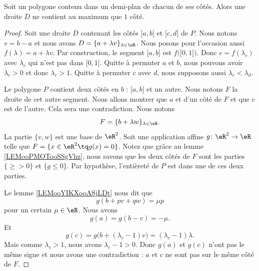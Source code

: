 \begin{lemma}	\label{LEMooMSJRooWYXQDY}
	Soit un polygone contenu dans un demi-plan de chacun de ses côtés. Alors une droite \( D\) ne contient au maximum que \( 1\) côté.
\end{lemma}

\begin{proof}
	Soit une droite \( D\) contenant les côtés \( \mathopen[ a,b\mathclose]\) et \( \mathopen[ c,d\mathclose]\) de \( P\). Nous notons \( v=b-a\) et nous avons \( D=\{ a+\lambda v \}_{\lambda\in \eR}\). Nous posons pour l'occasion aussi \( f(\lambda)=a+\lambda v\). Par construction, le segment \( \mathopen[ a,b\mathclose]\) est \( f\big( \mathopen[ 0,1\mathclose] \big)\). Donc \( c=f(\lambda_c)\) avec \( \lambda_c\) qui n'est pas dans \( \mathopen[ 0,1\mathclose]\). Quitte à permuter \( a\) et \( b\), nous pouvons avoir \( \lambda_c>0\) et donc \( \lambda_c>1\). Quitte à permuter \( c\) avec \( d\), nous supposons aussi \( \lambda_c<\lambda_d\).

	Le polygone \( P\) contient deux côtés en \( b\) : \( \mathopen[ a,b\mathclose]\) et un autre. Nous notons \( F\) la droite de cet autre segment. Nous allons montrer que \( a\) et d'un côté de \( F\) et que \( c\) est de l'autre. Cela sera une contradiction. Nous notons
	\begin{equation}
		F=\{ b+\lambda w \}_{\lambda\in \eR}.
	\end{equation}
	La partie \( \{ v,w \}\) est une base de \( \eR^2\). Soit une application affine \(g \colon \eR^2\to \eR  \) telle que \( F=\{ x\in \eR^2\tq g(x)=0 \}\). Notez que grâce au lemme \ref{LEMooPMOTooSSgVhz}, nous savons que les deux côtés de \( F\) sont les parties \( \{ \geq >0 \}\) et \( \{ g\leq 0 \}\). Par hypothèse, l'entièreté de \( P\) est dans une de ces deux parties.

	Le lemme \ref{LEMooYIKXooASjLDt} nous dit que
	\begin{equation}
		g(b+pv+qw)=\mu p
	\end{equation}
	pour un certain \( \mu\in \eR\). Nous avons
	\begin{equation}
		g(a)=g(b-v)=-\mu.
	\end{equation}
	Et
	\begin{equation}
		g(c)=g\big( b+(\lambda_c-1)v \big)=(\lambda_c-1)\lambda.
	\end{equation}
	Mais comme \( \lambda_c>1\), nous avons \( \lambda_c-1>0\). Donc \( g(a)\) et \( g(c)\) n'ont pas le même signe et nous avons une contradiction : \( a\) et \( c\) ne sont pas sur le même côté de \( F\).
\end{proof}



